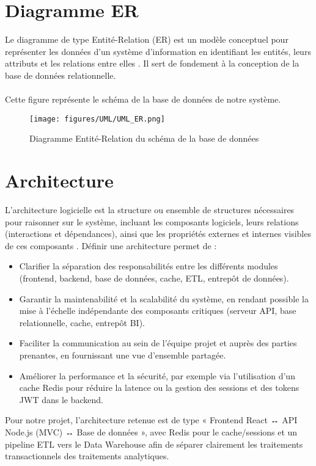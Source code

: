 \documentclass[12pt,a4paper]{report}
\begin{document}
\cleardoublepage

\section{Diagramme ER}

Le diagramme de type Entité-Relation (ER) est un modèle conceptuel pour représenter les données d’un système d’information en identifiant les entités, leurs attributs et les relations entre elles \cite{Chen1976}. Il sert de fondement à la conception de la base de données relationnelle.\\
\\
Cette figure représente le schéma de la base de données de notre système.\\
\begin{figure}[H]
  \centering
  \texttt{[image: figures/UML/UML\_ER.png]}
  \caption{Diagramme Entité-Relation du schéma de la base de données}
  \label{fig:er_diagram}
\end{figure}

\cleardoublepage

\section{Architecture}
L’architecture logicielle est la structure ou ensemble de structures nécessaires pour raisonner sur le système, incluant les composants logiciels, leurs relations (interactions et dépendances), ainsi que les propriétés externes et internes visibles de ces composants \cite{BassClementsKazman2012}.  
Définir une architecture permet de :
\begin{itemize}
  \item Clarifier la séparation des responsabilités entre les différents modules (frontend, backend, base de données, cache, ETL, entrepôt de données).  
  \item Garantir la maintenabilité et la scalabilité du système, en rendant possible la mise à l’échelle indépendante des composants critiques (serveur API, base relationnelle, cache, entrepôt BI).  
  \item Faciliter la communication au sein de l’équipe projet et auprès des parties prenantes, en fournissant une vue d’ensemble partagée.  
  \item Améliorer la performance et la sécurité, par exemple via l’utilisation d’un cache Redis pour réduire la latence ou la gestion des sessions et des tokens JWT dans le backend.  
\end{itemize}
Pour notre projet, l’architecture retenue est de type « Frontend React ↔ API Node.js (MVC) ↔ Base de données », avec Redis pour le cache/sessions et un pipeline ETL vers le Data Warehouse afin de séparer clairement les traitements transactionnels des traitements analytiques.
\end{document}
